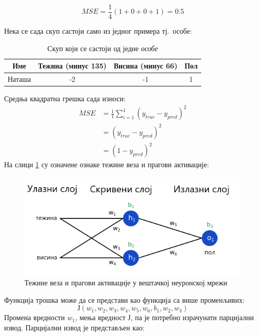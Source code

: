 \documentclass[12pt, а4paper]{article}
\begin{document}
\begin{equation}
MSE = \frac{1}{4} (1 + 0 + 0 + 1) = 0.5
\end{equation}

Нека се сада скуп састоји само из једног примера тј.\ особе:
\begin{table}[ht]
 \centering
 \begin{tabular}{| c | c | c | c |}
  \hline
  Име & Тежина (минус 135) & Висина (минус 66) & Пол \\
  \hline
  Наташа & -2 & -1 & 1\\
  \hline
 \end{tabular}
 \caption{Скуп који се састоји од једне \textit{особе}}
 \label{tab:natasa}
\end{table}

Средња квадратна грешка сада износи:
\begin{equation}
\begin{split}
MSE & = \frac{1}{1} \sum_{i=1}^{1} (y_{true} - y_{pred})^2 \\
& = (y_{true} - y_{pred})^2 \\
& = (1 - y_{pred})^2
\end{split}
\end{equation}
\newpage
На слици \ref{fig:nn_osnovaOznake} су означене ознаке тежине веза
и прагови активације:
\begin{figure}[H]
  \centering
      \includegraphics[scale=0.6]{slike/neuronskaMrezaOznake.png}
  \caption{Тежине веза и прагови активације у вештачкој неуронској мрежи}
  \label{fig:nn_osnovaOznake}
\end{figure}

Функција трошка може да се представи као функција 
са више променљивих:
\begin{equation}
Ј(w_1,w_2,w_3,w_4,w_5,w_6,b_1,w_2,w_3)
\end{equation}
Промена вредности $w_1$, мења вредност $Ј$, па је потребно израчунати
парцијални извод. Парцијални извод је представљен као:
\end{document}
